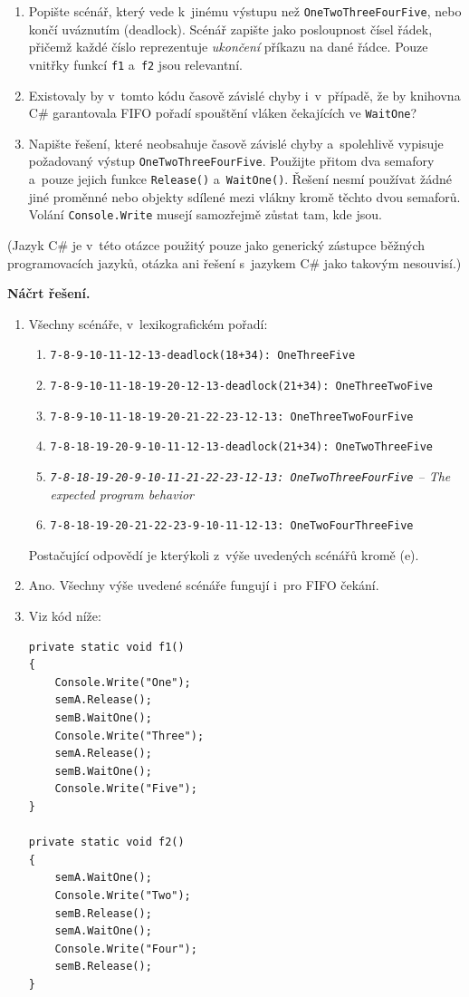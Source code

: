 \begin{enumerate}
\item Popište scénář, který vede k~jinému výstupu než \texttt{OneTwoThreeFourFive}, nebo
  končí uváznutím (deadlock). Scénář zapište jako posloupnost čísel řádek, přičemž každé
  číslo reprezentuje \textit{ukončení} příkazu na dané řádce. Pouze vnitřky funkcí
  \texttt{f1} a~\texttt{f2} jsou relevantní.
\item Existovaly by v~tomto kódu časově závislé chyby i~v~případě, že by knihovna C\#
  garantovala FIFO pořadí spouštění vláken čekajících ve \texttt{WaitOne}?
\item Napište řešení, které neobsahuje časově závislé chyby a~spolehlivě vypisuje
  požadovaný výstup \texttt{OneTwoThreeFourFive}. Použijte přitom dva semafory a~pouze
  jejich funkce \texttt{Release()} a~\texttt{WaitOne()}. Řešení nesmí používat žádné jiné
  proměnné nebo objekty sdílené mezi vlákny kromě těchto dvou semaforů. Volání
  \texttt{Console.Write} musejí samozřejmě zůstat tam, kde jsou.
\end{enumerate}

\noindent(Jazyk C\# je v~této otázce použitý pouze jako generický zástupce běžných
programovacích jazyků, otázka ani řešení s~jazykem C\# jako takovým nesouvisí.)

\medskip
\noindent\textbf{Náčrt řešení.}\par
\begin{enumerate}
\item Všechny scénáře, v~lexikografickém pořadí:
\begin{enumerate}
\item \texttt{7-8-9-10-11-12-13-deadlock(18+34): OneThreeFive}
\item \texttt{7-8-9-10-11-18-19-20-12-13-deadlock(21+34): OneThreeTwoFive}
\item \texttt{7-8-9-10-11-18-19-20-21-22-23-12-13: OneThreeTwoFourFive}
\item \texttt{7-8-18-19-20-9-10-11-12-13-deadlock(21+34): OneTwoThreeFive}
\item \textit{\texttt{7-8-18-19-20-9-10-11-21-22-23-12-13: OneTwoThreeFourFive} -- The expected program behavior}
\item \texttt{7-8-18-19-20-21-22-23-9-10-11-12-13: OneTwoFourThreeFive}
\end{enumerate}
Postačující odpovědí je kterýkoli z~výše uvedených scénářů kromě (e).

\item Ano. Všechny výše uvedené scénáře fungují i~pro FIFO čekání.

\item Viz kód níže:
\begin{lstlisting}[language={[Sharp]C}]
private static void f1()
{
    Console.Write("One");
    semA.Release();
    semB.WaitOne();
    Console.Write("Three");
    semA.Release();
    semB.WaitOne();
    Console.Write("Five");
}

private static void f2()
{
    semA.WaitOne();
    Console.Write("Two");
    semB.Release();
    semA.WaitOne();
    Console.Write("Four");
    semB.Release();
}
\end{lstlisting}
\end{enumerate}

